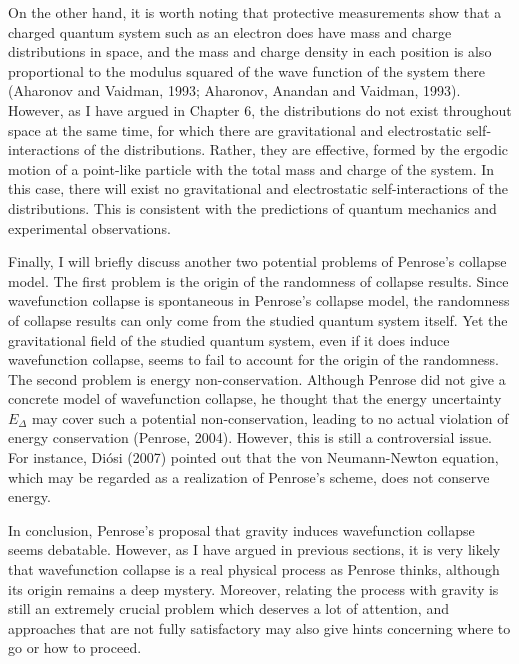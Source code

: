 On the other hand, it is worth noting that protective measurements show that a charged quantum system such as an electron does have mass and charge distributions in space, and the mass and charge density in each position is also proportional to the modulus squared of the wave function of the system there (Aharonov and Vaidman, 1993; Aharonov, Anandan and Vaidman, 1993). However, as I have argued in Chapter 6, the distributions do not exist throughout space at the same time, for which there are gravitational and electrostatic self-interactions of the distributions. Rather, they are effective, formed by the ergodic motion of a point-like particle with the total mass and charge of the system. In this case, there will exist no gravitational and electrostatic self-interactions of the distributions. This is consistent with the predictions of quantum mechanics and experimental observations.

Finally, I will briefly discuss another two potential problems of Penrose's collapse model. 
The first problem is the origin of the randomness of collapse results. 
Since wavefunction collapse is spontaneous in Penrose's collapse model, the randomness of collapse results can  only come from the studied quantum system itself. Yet the gravitational field of the studied quantum system, even if it does induce wavefunction collapse, seems to fail to account for the origin of the randomness. 
The second problem is energy non-conservation. Although Penrose did not give a concrete model of wavefunction collapse, he thought that the energy uncertainty $E_{\Delta}$ may cover such a potential non-conservation, leading to no actual violation of energy conservation (Penrose, 2004). However, this is still a controversial issue. For instance, Di\'{o}si (2007) pointed out that the von Neumann-Newton equation, which may be regarded as a realization of Penrose's scheme, does not conserve energy. 

In conclusion, Penrose's proposal that gravity induces wavefunction collapse seems debatable. However, as I have argued in previous sections, it is very likely that wavefunction collapse is a real physical process as Penrose thinks, although its origin remains a deep mystery. Moreover, relating the process with gravity is still an extremely crucial problem which deserves a lot of attention, and approaches that are not fully satisfactory may also give hints concerning where to go or how to proceed.


